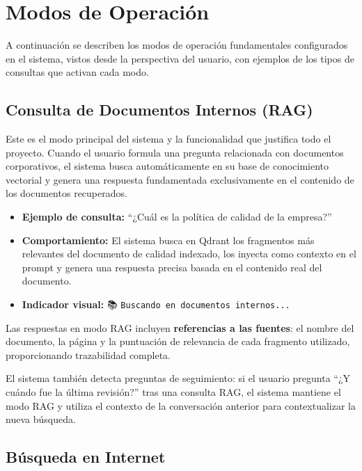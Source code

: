 \section{Modos de Operación}
\label{sec:modos}

A continuación se describen los modos de operación fundamentales configurados en el sistema, vistos desde la perspectiva del usuario, con ejemplos de los tipos de consultas que activan cada modo.

\subsection{Consulta de Documentos Internos (RAG)}
\label{subsec:modo-rag}

Este es el modo principal del sistema y la funcionalidad que justifica todo el proyecto. Cuando el usuario formula una pregunta relacionada con documentos corporativos, el sistema busca automáticamente en su base de conocimiento vectorial y genera una respuesta fundamentada exclusivamente en el contenido de los documentos recuperados.

\begin{itemize}
    \item \textbf{Ejemplo de consulta:} ``¿Cuál es la política de calidad de la empresa?''
    \item \textbf{Comportamiento:} El sistema busca en Qdrant los fragmentos más relevantes del documento de calidad indexado, los inyecta como contexto en el prompt y genera una respuesta precisa basada en el contenido real del documento.
    \item \textbf{Indicador visual:} 📚 \texttt{Buscando en documentos internos...}
\end{itemize}

Las respuestas en modo RAG incluyen \textbf{referencias a las fuentes}: el nombre del documento, la página y la puntuación de relevancia de cada fragmento utilizado, proporcionando trazabilidad completa.

El sistema también detecta preguntas de seguimiento: si el usuario pregunta ``¿Y cuándo fue la última revisión?'' tras una consulta RAG, el sistema mantiene el modo RAG y utiliza el contexto de la conversación anterior para contextualizar la nueva búsqueda.

\subsection{Búsqueda en Internet}
\label{subsec:modo-web}

